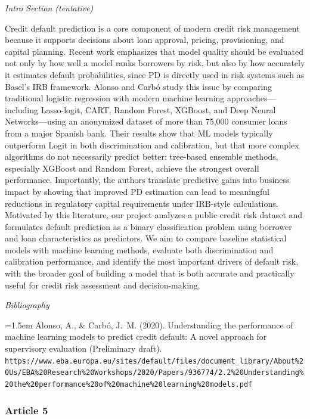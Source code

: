 \documentclass[letterpaper]{article}
\begin{document}
		\medskip
		
		\textit{Intro Section (tentative)}
		
		Credit default prediction is a core component of modern credit risk management because it supports decisions about loan approval, pricing, provisioning, and capital planning. Recent work emphasizes that model quality should be evaluated not only by how well a model ranks borrowers by risk, but also by how accurately it estimates default probabilities, since PD is directly used in risk systems such as Basel's IRB framework. Alonso and Carb\'{o} study this issue by comparing traditional logistic regression with modern machine learning approaches---including Lasso-logit, CART, Random Forest, XGBoost, and Deep Neural Networks---using an anonymized dataset of more than 75,000 consumer loans from a major Spanish bank. Their results show that ML models typically outperform Logit in both discrimination and calibration, but that more complex algorithms do not necessarily predict better: tree-based ensemble methods, especially XGBoost and Random Forest, achieve the strongest overall performance. Importantly, the authors translate predictive gains into business impact by showing that improved PD estimation can lead to meaningful reductions in regulatory capital requirements under IRB-style calculations. Motivated by this literature, our project analyzes a public credit risk dataset and formulates default prediction as a binary classification problem using borrower and loan characteristics as predictors. We aim to compare baseline statistical models with machine learning methods, evaluate both discrimination and calibration performance, and identify the most important drivers of default risk, with the broader goal of building a model that is both accurate and practically useful for credit risk assessment and decision-making.
		
		\medskip
		
		\textit{Bibliography}
		
		\hangindent=1.5em
		Alonso, A., \& Carb\'{o}, J.~M. (2020). Understanding the performance of machine learning models to predict credit default: A novel approach for supervisory evaluation (Preliminary draft). \texttt{https://www.eba.europa.eu/sites/default/files/document\_library/About\%20Us/EBA\%20Research\%20Workshops/2020/Papers/936774/2.2\%20Understanding\%20the\%20performance\%20of\%20machine\%20learning\%20models.pdf}
		
		\subsubsection{Article 5}
		
\end{document}
